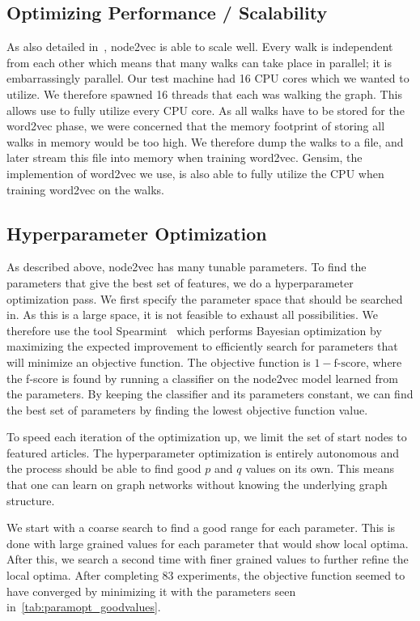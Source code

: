 \subsection{Optimizing Performance / Scalability}
As also detailed in~\cite{node2vec}, node2vec is able to scale well. Every walk is independent from each other which means that many walks can take place in parallel; it is embarrassingly parallel. Our test machine had 16 CPU cores which we wanted to utilize. We therefore spawned 16 threads that each was walking the graph. This allows use to fully utilize every CPU core. As all walks have to be stored for the word2vec phase, we were concerned that the memory footprint of storing all walks in memory would be too high. We therefore dump the walks to a file, and later stream this file into memory when training word2vec. Gensim, the implemention of word2vec we use, is also able to fully utilize the CPU when training word2vec on the walks.

\subsection{Hyperparameter Optimization}
As described above, node2vec has many tunable parameters. To find the parameters that give the best set of features, we do a hyperparameter optimization pass. We first specify the parameter space that should be searched in. As this is a large space, it is not feasible to exhaust all possibilities. We therefore use the tool Spearmint~\cite{snoek2012practical} which performs Bayesian optimization by maximizing the expected improvement to efficiently search for parameters that will minimize an objective function. The objective function is $1 - \text{f-score}$, where the f-score is found by running a classifier on the node2vec model learned from the parameters. By keeping the classifier and its parameters constant, we can find the best set of parameters by finding the lowest objective function value.

To speed each iteration of the optimization up, we limit the set of start nodes to featured articles. The hyperparameter optimization is entirely autonomous and the process should be able to find good $p$ and $q$ values on its own. This means that one can learn on graph networks without knowing the underlying graph structure.

We start with a coarse search to find a good range for each parameter. This is done with large grained values for each parameter that would show local optima. After this, we search a second time with finer grained values to further refine the local optima. After completing 83 experiments, the objective function seemed to have converged by minimizing it with the parameters seen in~\cref{tab:paramopt_goodvalues}.

